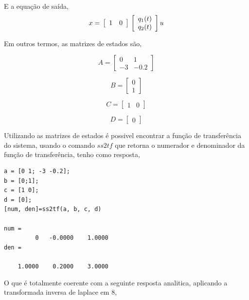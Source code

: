 \documentclass[a4paper, 10pt]{article}
\begin{document}
\begin{list}{\textbf{Questão .}}{
\setlength{\labelwidth}{-2mm} \setlength{\parsep}{0mm}
\setlength{\topsep}{0mm} \setlength{\leftmargin}{0mm}}
		E a equação de saída,
        \begin{equation}
          x = \\
          \left[\begin{array}{rr}
          1 & 0
          \end{array}\right] \\
          \left[\begin{array}{c}
          q_1(t) \\
          q_2(t)
          \end{array}\right] u
		\end{equation}
        
        
        Em outros termos, as matrizes de estados são,
        
        $$
        A =\left[\begin{array}{rr}
          0 & 1 \\
          -3 & -0.2
          \end{array}\right]
        $$
        
        $$
        B = \left[\begin{array}{r}
          0 \\
          1
          \end{array}\right]
        $$
        
        $$
        C = \left[\begin{array}{rr}
          1 & 0
          \end{array}\right]
        $$
        
        $$
        D = \left[\begin{array}{r}
        0 
        \end{array}\right]
        $$ 
        
        Utilizando as matrizes de estados é possivel encontrar
        a função de transferência do sistema, usando o comando       
        $ss2tf$ que retorna o numerador e denominador da função
        de transferência, tenho como resposta,
        
        
		\begin{lstlisting}
a = [0 1; -3 -0.2];
b = [0;1];
c = [1 0];
d = [0];
[num, den]=ss2tf(a, b, c, d)

num = 
         0   -0.0000    1.0000
den =

    1.0000    0.2000    3.0000
		\end{lstlisting}   
        
        O que é totalmente coerente com a seguinte resposta 
        analitica, aplicando a transformada
        inversa de laplace em 8,
        

\end{list}
\end{document}
